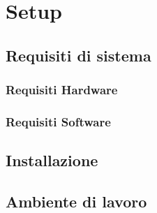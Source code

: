 \section{Setup}



\subsection{Requisiti di sistema}



\subsubsection{Requisiti Hardware}


\subsubsection{Requisiti Software}







\subsection{Installazione}









\subsection{Ambiente di lavoro}